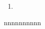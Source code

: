 \documentclass[a4paper,pdftex,10pt]{article}
\begin{document}
\maketitle

\begin{enumerate}
  \item 





\end{enumerate}


\clearpage
\begin{thebibliography}{99}
  nnnnnnnnnn
\end{thebibliography}



% 
% 

\end{document}
